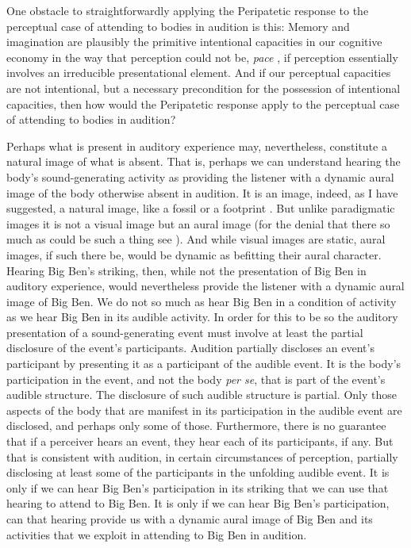 One obstacle to straightforwardly applying the Peripatetic response to the perceptual case of attending to bodies in audition is this: Memory and imagination are plausibly the primitive intentional capacities in our cognitive economy in the way that perception could not be, \emph{pace} \citet{Burge:2010uq}, if perception essentially involves an irreducible presentational element. And if our perceptual capacities are not intentional, but a necessary precondition for the possession of intentional capacities, then how would the Peripatetic response apply to the perceptual case of attending to bodies in audition?

Perhaps what is present in auditory experience may, nevertheless, constitute a natural image of what is absent. That is, perhaps we can understand hearing the body's sound-generating activity as providing the listener with a dynamic aural image of the body otherwise absent in audition. It is an image, indeed, as I have suggested, a natural image, like a fossil or a footprint \citep[for a recent general discussion of images see][]{Kulvicki:2014hb}. But unlike paradigmatic images it is not a visual image but an aural image (for the denial that there so much as could be such a thing see \citealt{Martin:2012af}). And while visual images are static, aural images, if such there be, would be dynamic as befitting their aural character. Hearing Big Ben's striking, then, while not the presentation of Big Ben in auditory experience, would nevertheless provide the listener with a dynamic aural image of Big Ben. We do not so much as hear Big Ben in a condition of activity as we hear Big Ben in its audible activity. In order for this to be so the auditory presentation of a sound-generating event must involve at least the partial disclosure of the event's participants. Audition partially discloses an event's participant by presenting it as a participant of the audible event. It is the body's participation in the event, and not the body \emph{per se}, that is part of the event's audible structure. The disclosure of such audible structure is partial. Only those aspects of the body that are manifest in its participation in the audible event are disclosed, and perhaps only some of those. Furthermore, there is no guarantee that if a perceiver hears an event, they hear each of its participants, if any. But that is consistent with audition, in certain circumstances of perception, partially disclosing at least some of the participants in the unfolding audible event. It is only if we can hear Big Ben's participation in its striking that we can use that hearing to attend to Big Ben. It is only if we can hear Big Ben's participation, can that hearing provide us with a dynamic aural image of Big Ben and its activities that we exploit in attending to Big Ben in audition.

